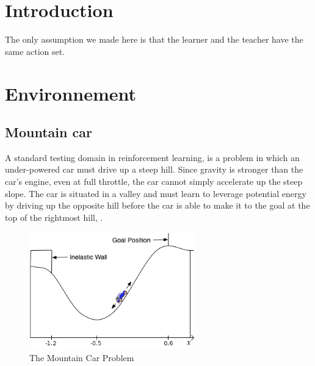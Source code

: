\documentclass[a4paper,12pt]{article}
\begin{document}
  \begin{titlepage}
  \def\titletype{Experiments}
   \def\majortitle{Learning from expert}
   \def\docversion{1.1}
   
  \end{titlepage}

  
  \clearpage

  \tableofcontents
  

  \clearpage
  
  \renewcommand{\labelitemi}{$\bullet$}
  \renewcommand{\labelitemii}{$\circ$}
  \renewcommand{\labelitemiii}{$\diamond$}
  \renewcommand{\labelitemiv}{$\ast$}
  

  \section{Introduction}
  
  
  The only assumption we made here is that the learner and the teacher have the same action set.

  \clearpage
  \section{Environnement}
    \subsection{Mountain car}

    A standard testing domain in reinforcement learning, is a problem in which an under-powered 
    car must drive up a steep hill. Since gravity is stronger than the car's engine, even at full 
    throttle, the car cannot simply accelerate up the steep slope. The car is situated in a valley
    and must learn to leverage potential energy by driving up the opposite hill before the car is 
    able to make it to the goal at the top of the rightmost hill, \cite{ReinforceLearningIntro} .
    \begin{figure}[H]
      \begin{center}
	\includegraphics[width=270px]{Mcar}
	\caption{ The Mountain Car Problem }
	\end{center}
    \end{figure}
    
\end{document}
